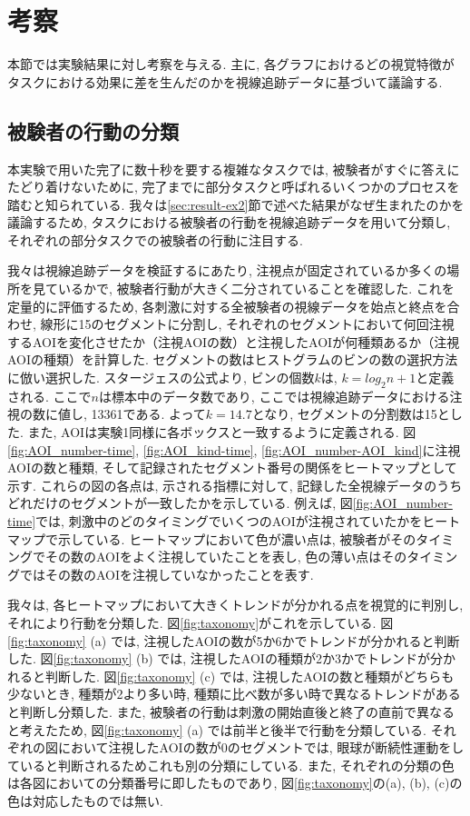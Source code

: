 \documentclass{kuee}
\begin{document}
\section{考察}
本節では実験結果に対し考察を与える.
主に, 各グラフにおけるどの視覚特徴がタスクにおける効果に差を生んだのかを視線追跡データに基づいて議論する.

\subsection{被験者の行動の分類}
\label{subsec:subtask}
本実験で用いた完了に数十秒を要する複雑なタスクでは, 被験者がすぐに答えにたどり着けないために, 完了までに部分タスクと呼ばれるいくつかのプロセスを踏むと知られている.
我々は\ref{sec:result-ex2}節で述べた結果がなぜ生まれたのかを議論するため, タスクにおける被験者の行動を視線追跡データを用いて分類し, それぞれの部分タスクでの被験者の行動に注目する.

我々は視線追跡データを検証するにあたり, 注視点が固定されているか多くの場所を見ているかで, 被験者行動が大きく二分されていることを確認した.
これを定量的に評価するため, 各刺激に対する全被験者の視線データを始点と終点を合わせ, 線形に15のセグメントに分割し, それぞれのセグメントにおいて何回注視するAOIを変化させたか（注視AOIの数）と注視したAOIが何種類あるか（注視AOIの種類）を計算した.
セグメントの数はヒストグラムのビンの数の選択方法に倣い選択した.
スタージェスの公式より, ビンの個数$k$は, $k = log_2 n + 1$と定義される.
ここで$n$は標本中のデータ数であり, ここでは視線追跡データにおける注視の数に値し, 13361である.
よって$k = 14.7$となり, セグメントの分割数は15とした.
また, AOIは実験1同様に各ボックスと一致するように定義される.
図\ref{fig:AOI_number-time}, \ref{fig:AOI_kind-time}, \ref{fig:AOI_number-AOI_kind}に注視AOIの数と種類, そして記録されたセグメント番号の関係をヒートマップとして示す.
これらの図の各点は, 示される指標に対して, 記録した全視線データのうちどれだけのセグメントが一致したかを示している.
例えば, 図\ref{fig:AOI_number-time}では, 刺激中のどのタイミングでいくつのAOIが注視されていたかをヒートマップで示している.
ヒートマップにおいて色が濃い点は, 被験者がそのタイミングでその数のAOIをよく注視していたことを表し, 色の薄い点はそのタイミングではその数のAOIを注視していなかったことを表す.

我々は, 各ヒートマップにおいて大きくトレンドが分かれる点を視覚的に判別し, それにより行動を分類した.
図\ref{fig:taxonomy}がこれを示している.
図\ref{fig:taxonomy} (a) では, 注視したAOIの数が5か6かでトレンドが分かれると判断した.
図\ref{fig:taxonomy} (b) では, 注視したAOIの種類が2か3かでトレンドが分かれると判断した.
図\ref{fig:taxonomy} (c) では, 注視したAOIの数と種類がどちらも少ないとき, 種類が2より多い時,  種類に比べ数が多い時で異なるトレンドがあると判断し分類した.
また, 被験者の行動は刺激の開始直後と終了の直前で異なると考えたため, 図\ref{fig:taxonomy} (a) では前半と後半で行動を分類している.
それぞれの図において注視したAOIの数が0のセグメントでは, 眼球が断続性運動をしていると判断されるためこれも別の分類にしている.
また, それぞれの分類の色は各図においての分類番号に即したものであり, 図\ref{fig:taxonomy}の(a), (b), (c)の色は対応したものでは無い.
\end{document}
